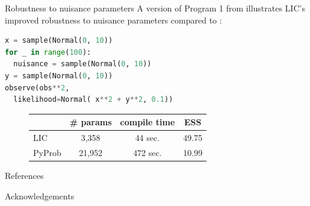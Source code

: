 \documentclass[final]{beamer}
\newlength{\onecolwid}
\begin{document}
\begin{frame}[t,containsverbatim]
\begin{columns}[t]
\begin{column}{\onecolwid}
      \begin{block}{Robustness to nuisance parameters}
        A version of Program 1 from \cite{harvey2019attention} illustrates
        LIC's improved robustness to nuisance parameters compared
        to \cite{pyprob2020}:
        \begin{lstlisting}[language=Python]
x = sample(Normal(0, 10))
for _ in range(100):
  nuisance = sample(Normal(0, 10))
y = sample(Normal(0, 10))
observe(obs**2, 
  likelihood=Normal( x**2 + y**2, 0.1))
        \end{lstlisting}
        \vspace{1cm}
        \begin{figure}
          \centering
          \begin{tabular}{lccc}
            \toprule
                   & \# params & compile time & ESS   \\
            \midrule
            LIC    & 3,358     & 44 sec.      & 49.75 \\
            PyProb & 21,952    & 472 sec.     & 10.99 \\
            \bottomrule
          \end{tabular}
        \end{figure}
      \end{block}


      \begin{block}{References}

        \nocite{*} %
        \footnotesize{
          
          
        }

      \end{block}



      \begin{block}{Acknowledgements}

        \small{} \\


\end{block}
\end{column}
\end{columns}
\end{frame}
\end{document}

